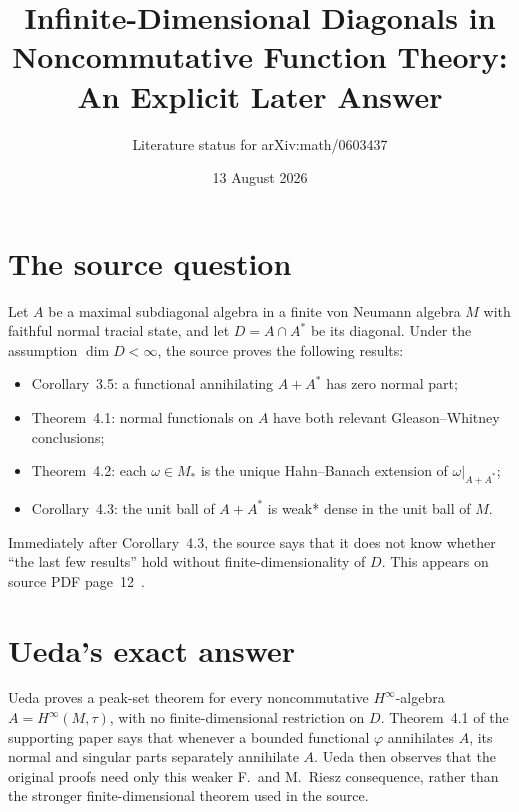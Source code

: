 \documentclass[11pt]{article}
\title{Infinite-Dimensional Diagonals in Noncommutative Function Theory:\\
An Explicit Later Answer}
\author{Literature status for arXiv:math/0603437}
\date{13 August 2026}
\begin{document}
\maketitle

\begin{center}
\end{center}

\section*{The source question}

Let $A$ be a maximal subdiagonal algebra in a finite von Neumann algebra
$M$ with faithful normal tracial state, and let
$D=A\cap A^*$ be its diagonal.  Under the assumption $\dim D<\infty$, the
source proves the following results:
\begin{itemize}
 \item Corollary~3.5: a functional annihilating $A+A^*$ has zero normal part;
 \item Theorem~4.1: normal functionals on $A$ have both relevant
 Gleason--Whitney conclusions;
 \item Theorem~4.2: each $\omega\in M_*$ is the unique Hahn--Banach extension
 of $\omega|_{A+A^*}$;
 \item Corollary~4.3: the unit ball of $A+A^*$ is weak* dense in the unit
 ball of $M$.
\end{itemize}
Immediately after Corollary~4.3, the source says that it does not know whether
``the last few results'' hold without finite-dimensionality of $D$.
This appears on source PDF page~12~\cite{source}.

\section*{Ueda's exact answer}

Ueda proves a peak-set theorem for every noncommutative $H^\infty$-algebra
$A=H^\infty(M,\tau)$, with no finite-dimensional restriction on $D$.
Theorem~4.1 of the supporting paper says that whenever a bounded functional
$\varphi$ annihilates $A$, its normal and singular parts separately annihilate
$A$.  Ueda then observes that the original proofs need only this weaker
F.~and M.~Riesz consequence, rather than the stronger finite-dimensional
theorem used in the source.
\end{document}
